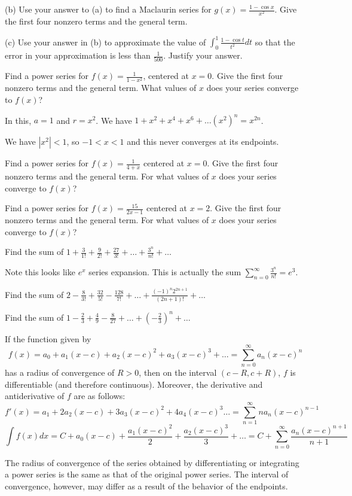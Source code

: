 \documentclass[../bccalc.tex]{subfiles}
\begin{document}
(b) Use your answer to (a) to find a Maclaurin series for $g(x)=\frac{1-\cos x}{x^2}$. Give the first four nonzero terms and the general term.

(c) Use your answer in (b) to approximate the value of $\int_0^1 \frac{1-\cos t}{t^2}dt$ so that the error in your approximation is less than $\frac{1}{500}$. Justify your answer.

\pagebreak
\begin{example}
    Find a power series for $f(x)=\frac{1}{1-x^2}$, centered at $x=0$. Give the first four nonzero terms and the general term. What values of $x$ does your series converge to $f(x)$?

    In this, $a=1$ and $r=x^2$. We have $1+x^2+x^4+x^6+\dots (x^2)^n = x^{2n}$.

    We have $|x^2|<1$, so $-1<x<1$ and this never converges at its endpoints.
\end{example}

\ex Find a power series for $f(x)=\frac{1}{4+x}$ centered at $x=0$. Give the first four nonzero terms and the general term. For what values of $x$ does your series converge to $f(x)$?

\ex Find a power series for $f(x)=\frac{15}{2x-1}$ centered at $x=2$. Give the first four nonzero terms and the general term. For what values of $x$ does your series converge to $f(x)$?

\begin{example}
    Find the sum of $1+\frac{3}{1!}+\frac{9}{2!}+\frac{27}{3!}+\dots+\frac{3^n}{n!}+\dots$

    Note this looks like $e^x$ series expansion. This is actually the sum $\sum_{n=0}^{\infty}\frac{3^n}{n!}=e^3$.
\end{example}

\ex Find the sum of $2-\frac{8}{3!}+\frac{32}{5!}-\frac{128}{7!}+\dots+\frac{(-1)^n 2^{2n+1}}{(2n+1)!} + \dots $

\ex Find the sum of $1-\frac{2}{3}+\frac{4}{9}-\frac{8}{27}+\dots + \left(-\frac{2}{3}\right)^n + \dots$

\begin{theorem}
    If the function given by 
    \[ f(x)=a_0+a_1(x-c)+a_2(x-c)^2+a_3(x-c)^3+\dots = \sum_{n=0}^{\infty}a_n(x-c)^n \]
    has a radius of convergence of $R>0$, then on the interval $(c-R, c+R)$, $f$ is differentiable (and therefore continuous). Moreover, the derivative and antiderivative of $f$ are as follows:
    \[ f'(x)=a_1+2a_2(x-c)+3a_3(x-c)^2 + 4a_4 (x-c)^3\dots = \sum_{n=1}^{\infty}na_n(x-c)^{n-1}\]
    \[ \int f(x)dx = C+a_0(x-c)+\frac{a_1(x-c)^2}{2}+\frac{a_2(x-c)^3}{3}+\dots = C+\sum_{n=0}^{\infty}\frac{a_n(x-c)^{n+1}}{n+1} \]

    The radius of convergence of the series obtained by differentiating or integrating a power series is the same as that of the original power series. The interval of convergence, however, may differ as a result of the behavior of the endpoints.
\end{theorem}
\end{document}
